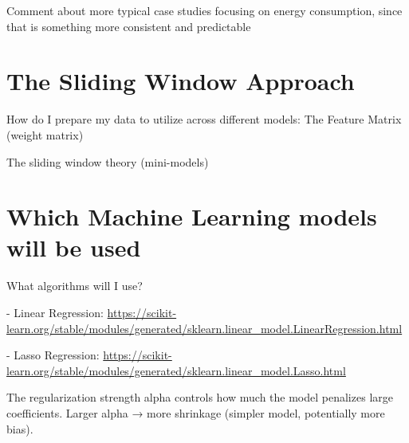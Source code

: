 \documentclass[12pt]{report} %
\begin{document}
Comment about more typical case studies focusing on energy consumption, since that is something more consistent and predictable


\section{The Sliding Window Approach}

How do I prepare my data to utilize across different models: The Feature Matrix (weight matrix)

The sliding window theory (mini-models)


\section{Which Machine Learning models will be used}
What algorithms will I use?

- Linear Regression: \url{https://scikit-learn.org/stable/modules/generated/sklearn.linear_model.LinearRegression.html}



- Lasso Regression: \url{https://scikit-learn.org/stable/modules/generated/sklearn.linear_model.Lasso.html}

The regularization strength alpha controls how much the model penalizes large coefficients. Larger alpha → more shrinkage (simpler model, potentially more bias).









\end{document}
